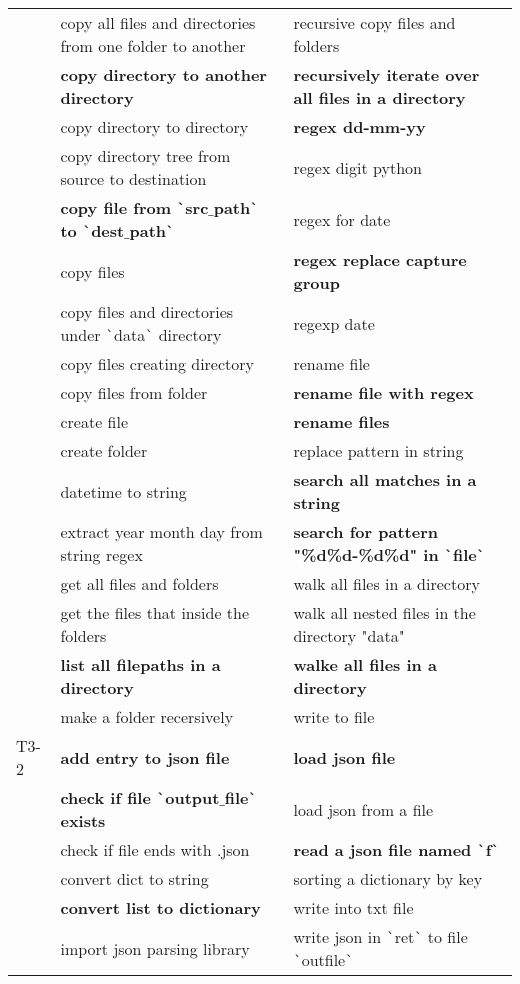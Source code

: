\begin{longtable}{lLL}
& copy all files and directories from one folder to another & recursive copy files and folders \\
& \textbf{copy directory to another directory} & \textbf{recursively iterate over all files in a directory} \\
& copy directory to directory & \textbf{regex dd-mm-yy} \\
& copy directory tree from source to destination & regex digit python \\
& \textbf{copy file from \texttt{\`}src$\_$path\texttt{\`} to \texttt{\`}dest$\_$path\texttt{\`}} & regex for date \\
& copy files & \textbf{regex replace capture group} \\
& copy files and directories under \texttt{\`}data\texttt{\`} directory & regexp date \\
& copy files creating directory & rename file \\
& copy files from folder & \textbf{rename file with regex} \\
& create file & \textbf{rename files} \\
& create folder & replace pattern in string \\
& datetime to string & \textbf{search all matches in a string} \\
& extract year month day from string regex & \textbf{search for pattern "\%d\%d-\%d\%d" in \texttt{\`}file\texttt{\`}} \\
& get all files and folders & walk all files in a directory \\
& get the files that inside the folders & walk all nested files in the directory "data" \\
& \textbf{list all filepaths in a directory} & \textbf{walke all files in a directory} \\
& make a folder recersively & write to file \\
T3-2 & \textbf{add entry to json file} & \textbf{load json file} \\
& \textbf{check if file \texttt{\`}output$\_$file\texttt{\`} exists} & load json from a file \\
& check if file ends with .json & \textbf{read a json file named \texttt{\`}f\texttt{\`}} \\
& convert dict to string & sorting a dictionary by key \\
& \textbf{convert list to dictionary} & write into txt file \\
& import json parsing library & write json in \texttt{\`}ret\texttt{\`} to file \texttt{\`}outfile\texttt{\`} \\

\end{longtable}
